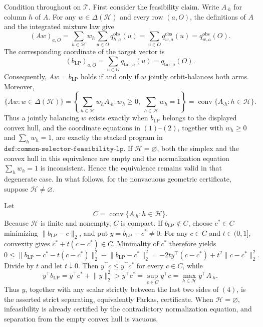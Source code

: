 Condition throughout on \(\mathcal T\). First consider the feasibility claim. Write \(A_{\cdot h}\) for column \(h\) of \(A\). For any \(w\in\Delta(\mathcal H)\) and every row \((a,O)\), the definitions of \(A\) and the integrated mixture law give
\[
(Aw)_{a,O}=\sum_{h\in\mathcal H}w_h\sum_{u\in O}q^{\mathrm{obs}}_{h,a}(u)=\sum_{u\in O}q^{\mathrm{obs}}_{w,a}(u)=q^{\mathrm{obs}}_{w,a}(O).
\tag{1}
\]
The corresponding coordinate of the target vector is
\[
(b_{\mathrm{LP}})_{a,O}=\sum_{u\in O}q_{\mathrm{tar},a}(u)=q_{\mathrm{tar},a}(O).
\tag{2}
\]
Consequently, \(Aw=b_{\mathrm{LP}}\) holds if and only if \(w\) jointly orbit-balances both arms. Moreover,
\[
\{Aw:w\in\Delta(\mathcal H)\}=\left\{\sum_{h\in\mathcal H}w_hA_{\cdot h}:w_h\ge0,\ \sum_{h\in\mathcal H}w_h=1\right\}=\operatorname{conv}\{A_{\cdot h}:h\in\mathcal H\}.
\tag{3}
\]
Thus a jointly balancing \(w\) exists exactly when \(b_{\mathrm{LP}}\) belongs to the displayed convex hull, and the coordinate equations in \((1)\)--\((2)\), together with \(w_h\ge0\) and \(\sum_h w_h=1\), are exactly the stacked program in \(\texttt{def:common-selector-feasibility-lp}\). If \(\mathcal H=\varnothing\), both the simplex and the convex hull in this equivalence are empty and the normalization equation \(\sum_h w_h=1\) is inconsistent. Hence the equivalence remains valid in that degenerate case. In what follows, for the nonvacuous geometric certificate, suppose \(\mathcal H\ne\varnothing\).

Let
\[
C=\operatorname{conv}\{A_{\cdot h}:h\in\mathcal H\}.
\]
Because \(\mathcal H\) is finite and nonempty, \(C\) is compact. If \(b_{\mathrm{LP}}\notin C\), choose \(c^*\in C\) minimizing \(\lVert b_{\mathrm{LP}}-c\rVert_2\), and put \(y=b_{\mathrm{LP}}-c^*\ne0\). For any \(c\in C\) and \(t\in(0,1]\), convexity gives \(c^*+t(c-c^*)\in C\). Minimality of \(c^*\) therefore yields
\[
0\le\lVert b_{\mathrm{LP}}-c^*-t(c-c^*)\rVert_2^2-\lVert b_{\mathrm{LP}}-c^*\rVert_2^2=-2t y^\top(c-c^*)+t^2\lVert c-c^*\rVert_2^2.
\]
Divide by \(t\) and let \(t\downarrow0\). Then \(y^\top c\le y^\top c^*\) for every \(c\in C\), while
\[
y^\top b_{\mathrm{LP}}=y^\top c^*+\lVert y\rVert_2^2>y^\top c^*=\sup_{c\in C}y^\top c=\max_{h\in\mathcal H}y^\top A_{\cdot h}.
\tag{4}
\]
Thus \(y\), together with any scalar strictly between the last two sides of \((4)\), is the asserted strict separating, equivalently Farkas, certificate. When \(\mathcal H=\varnothing\), infeasibility is already certified by the contradictory normalization equation, and separation from the empty convex hull is vacuous.

